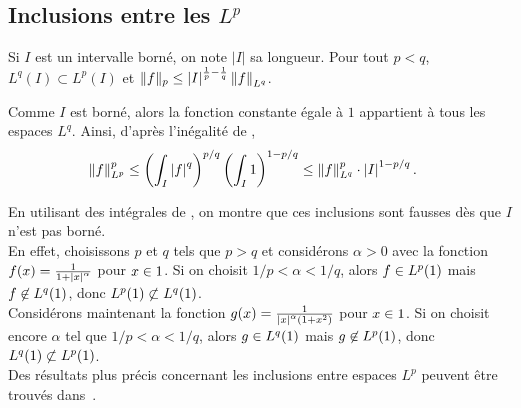 \subsection{Inclusions entre les $L^p$}

\begin{theo}
Si $I$ est un intervalle borné, on note $|I|$ sa longueur. Pour tout $p < q$, $L^q(I) \subset L^p(I)$ et $\|f\|_p \leq \left| I \right|^{\frac{1}{p} - \frac{1}{q}} \norm{f}_{L^q}$.
\end{theo}

\begin{demo}
Comme $I$ est borné, alors la fonction constante égale à $1$ appartient à tous les espaces $L^q$. Ainsi, d'après l'inégalité de ,
\begin{align*}
\norm{f}_{L^p}^p
&\leq \left(\int_I \left| f \right|^q\right)^{p/q} \left(\int_I 1\right)^{1-p/q}
\leq \norm{f}_{L^q}^p \cdot \left| I \right|^{1-p/q}.
\end{align*}
\end{demo}

\begin{remarque}
En utilisant des intégrales de , on montre que ces inclusions sont fausses dès que $I$ n'est pas borné. \\
En effet, choisissons $p$ et $q$ tels que $p > q$ et considérons $\alpha > 0$ avec la fonction $f(x) = \frac{1}{1+\left| x \right|^\alpha}$ pour $x \in 1$. Si on choisit $1/p < \alpha < 1/q$, alors $f \in L^p(1)$ mais $f \not\in L^q(1)$, donc $L^p(1) \not\subset L^q(1)$. \\
Considérons maintenant la fonction $g(x) = \frac{1}{\left| x \right|^\alpha (1+x^2)}$ pour $x \in 1$. Si on choisit encore $\alpha$ tel que $1/p <  \alpha < 1/q$, alors $g \in L^q(1)$ mais $g \not\in L^p(1)$, donc $L^q(1) \not\subset L^p(1)$.\\
Des résultats plus précis concernant les inclusions entre espaces $L^p$ peuvent être trouvés dans~\cite{rudin2009}.
\end{remarque}